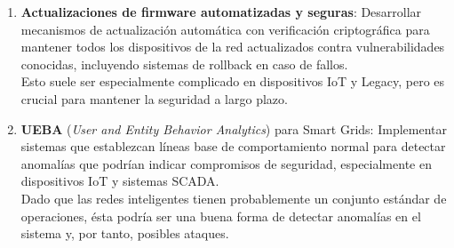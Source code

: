 \begin{enumerate}
   
   
   


   \item \textbf{Actualizaciones de firmware automatizadas y seguras}: Desarrollar mecanismos de actualización automática con verificación criptográfica para mantener todos los dispositivos de la red actualizados contra vulnerabilidades conocidas, incluyendo sistemas de rollback en caso de fallos.\\
   Esto suele ser especialmente complicado en dispositivos IoT y Legacy, pero es crucial para mantener la seguridad a largo plazo.
   
   

   \item \textbf{UEBA} (\textit{User and Entity Behavior Analytics}) para Smart Grids: Implementar sistemas que establezcan líneas base de comportamiento normal para detectar anomalías que podrían indicar compromisos de seguridad, especialmente en dispositivos IoT y sistemas SCADA.\\
   Dado que las redes inteligentes tienen probablemente un conjunto estándar de operaciones, ésta podría ser una buena forma de detectar anomalías en el sistema y, por tanto, posibles ataques.
   

\end{enumerate}
